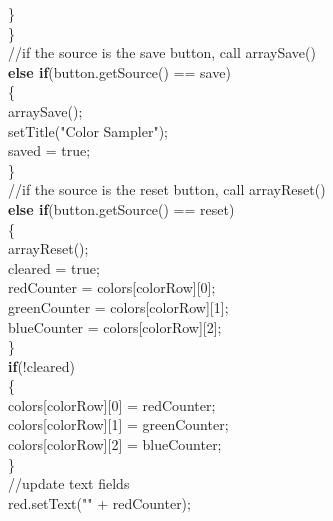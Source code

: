 \documentclass[12pt]{article}
\begin{document}
\begin{flushleft}
{\qquad \qquad \qquad \qquad	 \qquad						\}\\
\qquad \qquad \qquad \qquad					\}\\
\qquad \qquad \qquad \qquad					//if the source is the save button, call arraySave()\\
\qquad \qquad \qquad \qquad					\textbf{else if}(button.getSource() == save)\\
\qquad \qquad \qquad \qquad					\{\\
\qquad \qquad \qquad \qquad	\qquad					arraySave();\\
\qquad \qquad \qquad \qquad	\qquad						setTitle("Color Sampler");\\
\qquad \qquad \qquad \qquad	\qquad						saved = true;\\
\qquad \qquad \qquad \qquad					\}\\
\qquad \qquad \qquad \qquad					//if the source is the reset button, call arrayReset()\\
\qquad \qquad \qquad \qquad					\textbf{else if}(button.getSource() == reset)\\
\qquad \qquad \qquad \qquad					\{\\
\qquad \qquad \qquad \qquad	\qquad					arrayReset();\\	
\qquad \qquad \qquad \qquad	\qquad						cleared = true;\\     
					[2mm]
\qquad \qquad \qquad \qquad	\qquad						redCounter = colors[colorRow][0];\\
\qquad \qquad \qquad \qquad	\qquad						greenCounter = colors[colorRow][1];\\
\qquad \qquad \qquad \qquad	\qquad						blueCounter = colors[colorRow][2];\\        
\qquad \qquad \qquad \qquad						\}\\
				[2mm]
\qquad \qquad \qquad \qquad						\textbf{if}(!cleared)\\
\qquad \qquad \qquad \qquad				\{\\
\qquad \qquad \qquad \qquad	\qquad					colors[colorRow][0] = redCounter;\\
\qquad \qquad \qquad \qquad	\qquad					colors[colorRow][1] = greenCounter;\\
\qquad \qquad \qquad \qquad	\qquad					colors[colorRow][2] = blueCounter;\\
\qquad \qquad \qquad \qquad				\}\\
				[2mm]
\qquad \qquad \qquad \qquad					//update text fields\\
\qquad \qquad \qquad \qquad					red.setText("" + redCounter);\\
}
\end{flushleft}
\end{document}
